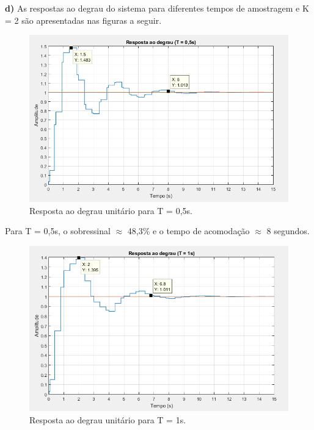 \documentclass{article}
\begin{document}
    \vspace{14mm}
    {\textbf{d)} As respostas ao degrau do sistema para diferentes tempos de amostragem e K = 2 são apresentadas nas figuras a seguir.}

    \begin{figure}[H]
       \centering
            \includegraphics[width=1\linewidth]{images/rDeg05.png}
            \caption{Resposta ao degrau unitário para T = 0,5s.}
            \label{fig:rDeg05}
    \end{figure}

    {Para T = 0,5s, o sobressinal $\approx$  48,3\% e o tempo de acomodação $\approx$ 8 segundos.}

    \vspace{7mm}
    \begin{figure}[H]
       \centering
            \includegraphics[width=1\linewidth]{images/rDeg1.png}
            \caption{Resposta ao degrau unitário para T = 1s.}
            \label{fig:rDeg1}
    \end{figure}
\end{document}
